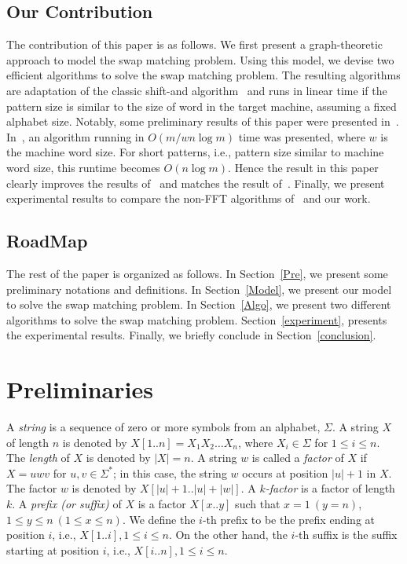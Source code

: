 \documentclass{llncs}
\begin{document}
\subsection{Our Contribution}
The contribution of this paper is as follows. We first present a graph-theoretic approach to model the swap matching problem. Using this model, we devise two efficient algorithms to solve the swap matching problem. The resulting algorithms are adaptation of the classic shift-and algorithm~\cite{CharrasL04} and runs in linear time if the pattern size is similar to the size of word in the target machine, assuming a fixed alphabet size. Notably, some preliminary results of this paper were presented in~\cite{IR}. In~\cite{IR}, an algorithm running in $O(m/w n\log m)$ time was presented, where $w$ is the machine word size. For short patterns, i.e., pattern size similar to machine word size, this runtime becomes $O(n\log m)$. Hence the result in this paper clearly improves the results of~\cite{IR} and matches the result of~\cite{CS}. Finally, we present experimental results to compare the non-FFT algorithms of~\cite{CS,CCS} and our work.  



\subsection{RoadMap}
The rest of the paper is organized as follows. In Section~\ref{Pre}, we present some preliminary notations and definitions. In Section~\ref{Model}, we present our model to solve the swap matching problem. In Section~\ref{Algo}, we present two different algorithms to solve the swap matching problem. Section~\ref{experiment}, presents the experimental results. Finally, we briefly conclude in Section~\ref{conclusion}.



\section{\label{Pre}Preliminaries}
A \emph{string} is a sequence of zero or more symbols from an alphabet, $\Sigma$. A string $X$ of length $n$ is denoted by $X[1..n] = X_1 X_2 \ldots X_{n}$, where $X_i \in \Sigma$ for $1 \leq i \leq n$. The \emph{length} of $X$ is denoted by $|X|= n$. A string $w$ is called a \emph{factor} of $X$ if $X = uwv$ for $u, v\in \Sigma^*$; in this case, the string $w$ occurs at position $|u|+1$ in $X$. The factor $w$ is denoted by $X[|u|+1..|u|+|w|]$. A \emph{$k$-factor} is a factor of length $k$. A \emph{prefix (or suffix)} of $X$ is a factor $X[x..y]$ such that $x=1~(y=n)$, $1\leq y \leq n~(1\leq x \leq n)$. We define the $i$-th prefix to be the prefix ending at position $i$, i.e., $X[1..i], 1\leq i\leq n$. On the other hand, the $i$-th suffix is the suffix starting at position $i$, i.e., $X[i..n], 1\leq i\leq n$.
\end{document}
